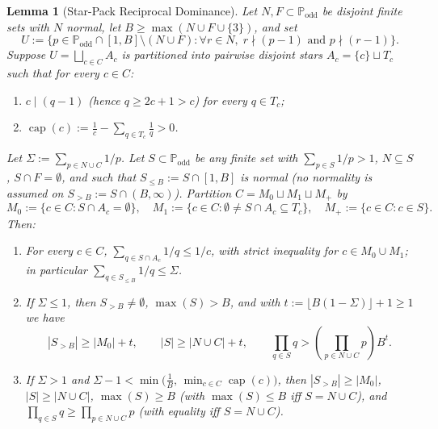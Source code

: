 \documentclass[11pt]{article}
\newtheorem{lemma}[theorem]{Lemma}
\theoremstyle{remark}
\newcommand{\Podd}{\mathbb{P}_{\mathrm{odd}}}
\newcommand{\capf}{\operatorname{cap}}
\begin{document}
\begin{lemma}[Star-Pack Reciprocal Dominance]\label{lem:starpack}
Let $N, F \subset \Podd$ be disjoint finite sets with $N$ normal, let
$B \ge \max(N \cup F \cup \{3\})$, and set
\[
  U := \bigl\{p \in \Podd \cap [1, B] \setminus (N \cup F) :
  \forall r \in N,\; r \nmid (p - 1) \text{ and } p \nmid (r - 1)\bigr\}.
\]
Suppose $U = \bigsqcup_{c\in C} A_c$ is partitioned into pairwise disjoint
\emph{stars} $A_c = \{c\} \sqcup T_c$ such that for every $c \in C$:
\begin{enumerate}
  \item[(i)] $c \mid (q - 1)$ (hence $q \ge 2c + 1 > c$) for every $q \in T_c$;
  \item[(ii)] $\capf(c) := \frac{1}{c} - \sum_{q\in T_c} \frac{1}{q} > 0$.
\end{enumerate}
Let $\Sigma := \sum_{p \in N \cup C} 1/p$. Let $S \subset \Podd$ be any finite
set with $\sum_{p\in S} 1/p > 1$, $N \subseteq S$, $S \cap F = \emptyset$, and
such that $S_{\le B} := S \cap [1, B]$ is normal (no normality is assumed on
$S_{>B} := S \cap (B, \infty)$). Partition $C = M_0 \sqcup M_1 \sqcup M_+$ by
\[
  M_0 := \{c \in C : S \cap A_c = \emptyset\},
  \quad
  M_1 := \{c \in C : \emptyset \neq S \cap A_c \subseteq T_c\},
  \quad
  M_+ := \{c \in C : c \in S\}.
\]
Then:
\begin{enumerate}
  \item For every $c \in C$, $\sum_{q \in S \cap A_c} 1/q \le 1/c$, with strict
  inequality for $c \in M_0 \cup M_1$; in particular
  $\sum_{q \in S_{\le B}} 1/q \le \Sigma$.
  \item If $\Sigma \le 1$, then $S_{>B} \neq \emptyset$, $\max(S) > B$, and with
  $t := \lfloor B(1 - \Sigma)\rfloor + 1 \ge 1$ we have
  \[
    |S_{>B}| \ge |M_0| + t,
    \qquad
    |S| \ge |N \cup C| + t,
    \qquad
    \prod_{q\in S} q > \left(\prod_{p \in N \cup C} p\right) B^t.
  \]
  \item If $\Sigma > 1$ and
  $\Sigma - 1 < \min\bigl(\frac{1}{B},\, \min_{c\in C} \capf(c)\bigr)$, then
  $|S_{>B}| \ge |M_0|$, $|S| \ge |N \cup C|$, $\max(S) \ge B$ (with
  $\max(S) \le B$ iff $S = N \cup C$), and $\prod_{q\in S} q \ge \prod_{p\in N\cup C} p$
  (with equality iff $S = N \cup C$).
\end{enumerate}
\end{lemma}
\end{document}
